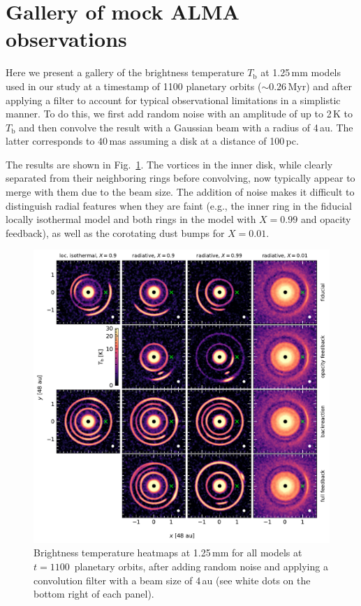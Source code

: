 \documentclass[fleqn,usenatbib,useAMS]{mnras}
\newcommand{\Tb}{T_\mathrm{b}}
\begin{document}

\section{Gallery of mock ALMA observations}
\label{apdx:gallery}

Here we present a gallery of the brightness temperature $\Tb$ at 1.25\,mm models used in our study at a timestamp of 1100 planetary orbits ($\sim$0.26\,Myr) and after applying a filter to account for typical observational limitations in a simplistic manner. To do this, we first add random noise with an amplitude of up to 2\,K to $\Tb$ and then convolve the result with a Gaussian beam with a radius of 4\,au. The latter corresponds to $40$\,mas assuming a disk at a distance of 100\,pc.

The results are shown in Fig.~\ref{fig:gallery}. The vortices in the inner disk, while clearly separated from their neighboring rings before convolving, now typically appear to merge with them due to the beam size. The addition of noise makes it difficult to distinguish radial features when they are faint (e.g., the inner ring in the fiducial locally isothermal model and both rings in the model with $X=0.99$ and opacity feedback), as well as the corotating dust bumps for $X=0.01$. 

\clearpage %

\begin{figure}
	\centering
	\includegraphics[width=\textwidth]{gallery-full.pdf}
	\parbox{\textwidth}{\caption{Brightness temperature heatmaps at 1.25\,mm for all models at $t=1100$~planetary orbits, after adding random noise and applying a convolution filter with a beam size of 4\,au (see white dots on the bottom right of each panel).}}
	\label{fig:gallery}
\end{figure}

\bsp	%
\label{lastpage}
\end{document}
